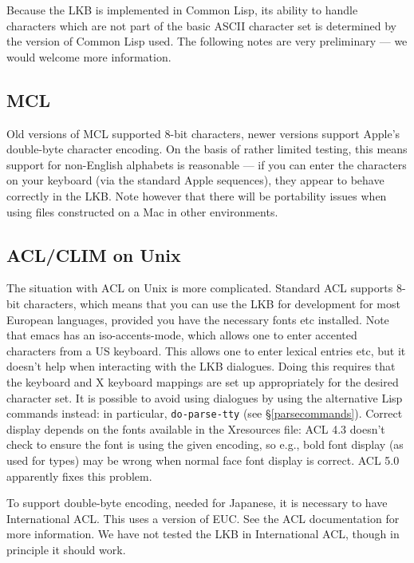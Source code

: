 \documentclass[12pt]{report}
\newcommand{\functionname}[1]{{\tt #1}}
\begin{document}
Because the LKB is implemented in Common Lisp, its ability 
to handle characters
which are not part of the basic ASCII character set is determined by the
version of Common Lisp used.  The following notes are very preliminary --- we
would welcome more information.

\subsection{MCL}

Old versions of MCL supported 8-bit characters, newer versions support Apple's
double-byte character encoding.  On the basis of rather limited testing, this
means support for non-English alphabets is reasonable --- if you can enter the
characters on your keyboard (via the standard Apple sequences), they appear to
behave correctly in the LKB.  Note however that there will be portability 
issues when using files constructed on a Mac in other environments.

\subsection{ACL/CLIM on Unix}

The situation with
ACL on Unix is more complicated.  Standard ACL supports 8-bit 
characters, which
means that you can use the LKB for development for most European languages,
provided you have the necessary fonts etc installed.  Note that emacs has an
iso-accents-mode, which allows one to enter accented characters from a US
keyboard.  This allows one to enter lexical entries etc, but it doesn't help
when interacting with the LKB dialogues.  
Doing this requires that the keyboard and X keyboard mappings are
set up appropriately for the desired character set.
It is possible to avoid using dialogues
by using the alternative Lisp commands
instead: in particular, \functionname{do-parse-tty} (see
\S\ref{parsecommands}).  Correct display depends on the fonts available in
the Xresources file: ACL 4.3 doesn't check to ensure the font
is using the given encoding, so e.g., bold font display (as used for types)
may be wrong when normal face font display is correct.  ACL 5.0
apparently fixes this problem.

To support double-byte encoding, needed for Japanese, it is necessary to have
International ACL.  This uses a version of EUC.  See the ACL documentation for
more information.  We have not tested the LKB in International ACL,
though in principle it should work.
\end{document}
